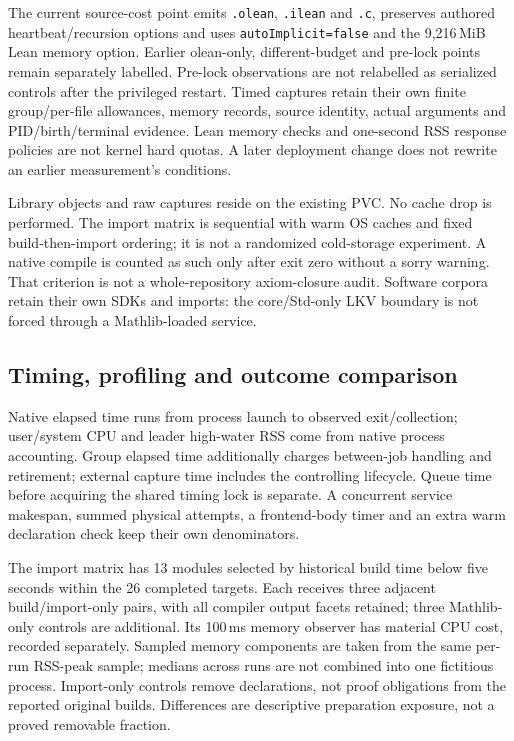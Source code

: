 \documentclass[10pt,twocolumn]{article}
\begin{document}
The current source-cost point emits \texttt{.olean}, \texttt{.ilean} and
\texttt{.c}, preserves authored heartbeat/recursion options and uses
\texttt{autoImplicit=false} and the 9,216\,MiB Lean memory option.
Earlier olean-only, different-budget and pre-lock points remain separately
labelled. Pre-lock observations are not relabelled as serialized controls
after the privileged restart.
Timed captures retain their own finite group/per-file allowances, memory
records, source identity, actual arguments and PID/birth/terminal evidence.
Lean memory checks and one-second RSS response policies are not kernel
hard quotas. A later deployment change does not rewrite an earlier
measurement's conditions.

Library objects and raw captures reside on the existing PVC.
No cache drop is performed. The import matrix is sequential with warm OS
caches and fixed build-then-import ordering; it is not a randomized
cold-storage experiment.
A native compile is counted as such only after exit zero without a sorry
warning. That criterion is not a whole-repository axiom-closure audit.
Software corpora retain their own SDKs and imports: the core/Std-only LKV
boundary is not forced through a Mathlib-loaded service.

\subsection{Timing, profiling and outcome comparison}
Native elapsed time runs from process launch to observed exit/collection;
user/system CPU and leader high-water RSS come from native process
accounting. Group elapsed time additionally charges between-job handling
and retirement; external capture time includes the controlling lifecycle.
Queue time before acquiring the shared timing lock is separate.
A concurrent service makespan, summed physical attempts, a frontend-body
timer and an extra warm declaration check keep their own denominators.

The import matrix has 13 modules selected by historical build time below
five seconds within the 26 completed targets.
Each receives three adjacent build/import-only pairs, with all compiler
output facets retained; three Mathlib-only controls are additional.
Its 100\,ms memory observer has material CPU cost, recorded separately.
Sampled memory components are taken from the same per-run RSS-peak sample;
medians across runs are not combined into one fictitious process.
Import-only controls remove declarations, not proof obligations from the
reported original builds. Differences are descriptive preparation exposure,
not a proved removable fraction.
\end{document}

